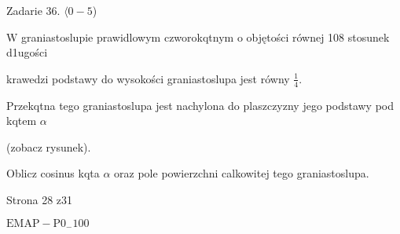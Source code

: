 \documentclass[a4paper,12pt]{article}
\begin{document}
Zadarie 36. $\langle 0-5$)

$\mathrm{W}$ graniastoslupie prawidlowym czworokqtnym o objętości równej 108 stosunek d1ugości

krawedzi podstawy do wysokości graniastoslupa jest równy $\displaystyle \frac{1}{4}.$

Przekqtna tego graniastoslupa jest nachylona do plaszczyzny jego podstawy pod kqtem $\alpha$

(zobacz rysunek).

Oblicz cosinus kqta $\alpha$ oraz pole powierzchni calkowitej tego graniastoslupa.

Strona 28 z31

$\mathrm{E}\mathrm{M}\mathrm{A}\mathrm{P}-\mathrm{P}0_{-}100$
\end{document}
